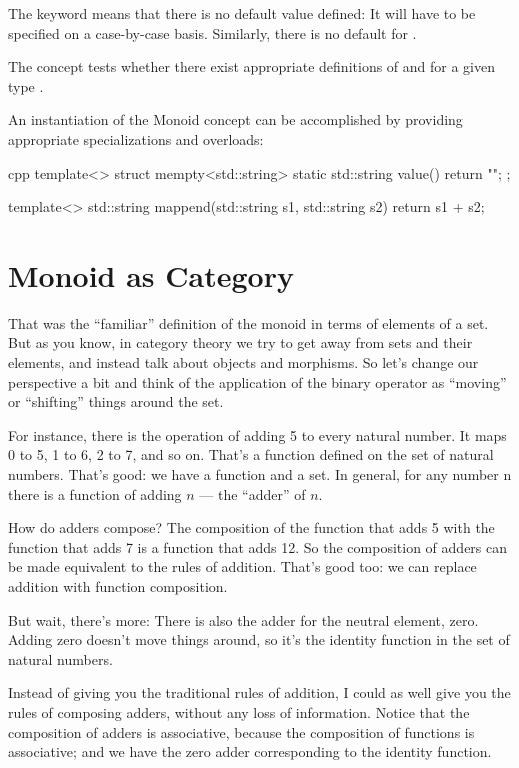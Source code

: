 The keyword  means that there is no default value
defined: It will have to be specified on a case-by-case basis.
Similarly, there is no default for .

The concept  tests whether there exist appropriate definitions of
 and  for a given type .

An instantiation of the Monoid concept can be accomplished by providing
appropriate specializations and overloads:

\begin{snip}{cpp}
template<>
struct mempty<std::string> {
    static std::string value() { return ""; }
};

template<>
std::string mappend(std::string s1, std::string s2) {
    return s1 + s2;
}
\end{snip}

\section{Monoid as Category}

That was the ``familiar'' definition of the monoid in terms of elements
of a set. But as you know, in category theory we try to get away from
sets and their elements, and instead talk about objects and morphisms.
So let's change our perspective a bit and think of the application of
the binary operator as ``moving'' or ``shifting'' things around the set.

For instance, there is the operation of adding 5 to every natural
number. It maps 0 to 5, 1 to 6, 2 to 7, and so on. That's a function
defined on the set of natural numbers. That's good: we have a function
and a set. In general, for any number n there is a function of adding $n$
--- the ``adder'' of $n$.

How do adders compose? The composition of the function that adds 5 with
the function that adds 7 is a function that adds 12. So the composition
of adders can be made equivalent to the rules of addition. That's good
too: we can replace addition with function composition.

But wait, there's more: There is also the adder for the neutral element,
zero. Adding zero doesn't move things around, so it's the identity
function in the set of natural numbers.

Instead of giving you the traditional rules of addition, I could as well
give you the rules of composing adders, without any loss of information.
Notice that the composition of adders is associative, because the
composition of functions is associative; and we have the zero adder
corresponding to the identity function.

